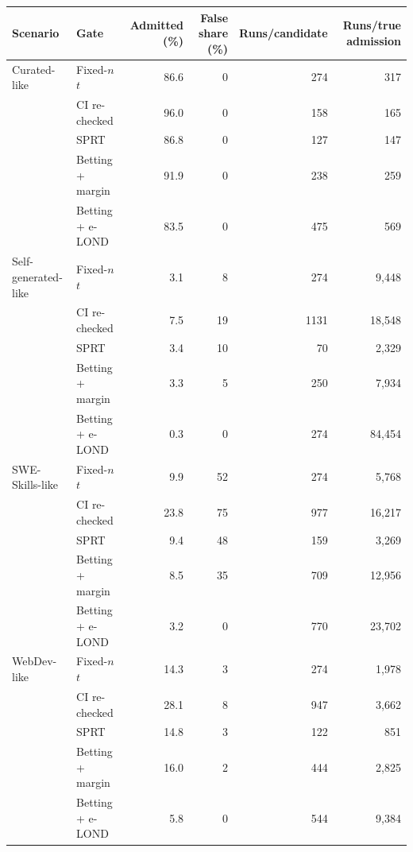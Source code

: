 \begin{tabular}{llrrrr}
\toprule
Scenario & Gate & Admitted (\%) & False share (\%) & Runs/candidate & Runs/true admission \\
\midrule
Curated-like & Fixed-$n$ $t$ & 86.6 & 0 & 274 & 317 \\
 & CI re-checked & 96.0 & 0 & 158 & 165 \\
 & SPRT & 86.8 & 0 & 127 & 147 \\
 & Betting + margin & 91.9 & 0 & 238 & 259 \\
 & Betting + e-LOND & 83.5 & 0 & 475 & 569 \\
\addlinespace
Self-generated-like & Fixed-$n$ $t$ & 3.1 & 8 & 274 & 9{,}448 \\
 & CI re-checked & 7.5 & 19 & 1131 & 18{,}548 \\
 & SPRT & 3.4 & 10 & 70 & 2{,}329 \\
 & Betting + margin & 3.3 & 5 & 250 & 7{,}934 \\
 & Betting + e-LOND & 0.3 & 0 & 274 & 84{,}454 \\
\addlinespace
SWE-Skills-like & Fixed-$n$ $t$ & 9.9 & 52 & 274 & 5{,}768 \\
 & CI re-checked & 23.8 & 75 & 977 & 16{,}217 \\
 & SPRT & 9.4 & 48 & 159 & 3{,}269 \\
 & Betting + margin & 8.5 & 35 & 709 & 12{,}956 \\
 & Betting + e-LOND & 3.2 & 0 & 770 & 23{,}702 \\
\addlinespace
WebDev-like & Fixed-$n$ $t$ & 14.3 & 3 & 274 & 1{,}978 \\
 & CI re-checked & 28.1 & 8 & 947 & 3{,}662 \\
 & SPRT & 14.8 & 3 & 122 & 851 \\
 & Betting + margin & 16.0 & 2 & 444 & 2{,}825 \\
 & Betting + e-LOND & 5.8 & 0 & 544 & 9{,}384 \\
\bottomrule
\end{tabular}

